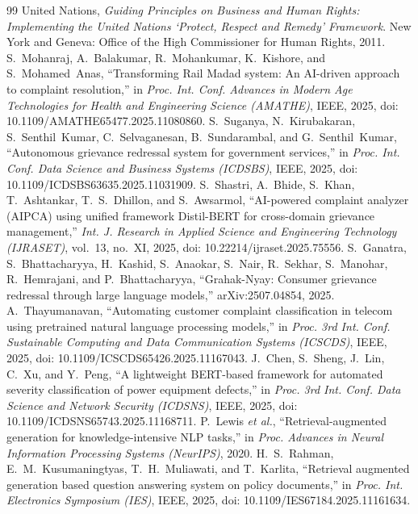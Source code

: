 \documentclass[conference]{IEEEtran}
\begin{document}
\begin{thebibliography}{99}
\footnotesize
{} United Nations, \emph{Guiding Principles on Business and Human Rights: Implementing the United Nations `Protect, Respect and Remedy' Framework}. New York and Geneva: Office of the High Commissioner for Human Rights, 2011.
 S.~Mohanraj, A.~Balakumar, R.~Mohankumar, K.~Kishore, and S.~Mohamed~Anas, ``Transforming Rail Madad system: An AI-driven approach to complaint resolution,'' in \emph{Proc. Int. Conf. Advances in Modern Age Technologies for Health and Engineering Science (AMATHE)}, IEEE, 2025, doi: 10.1109/AMATHE65477.2025.11080860.
 S.~Suganya, N.~Kirubakaran, S.~Senthil~Kumar, C.~Selvaganesan, B.~Sundarambal, and G.~Senthil~Kumar, ``Autonomous grievance redressal system for government services,'' in \emph{Proc. Int. Conf. Data Science and Business Systems (ICDSBS)}, IEEE, 2025, doi: 10.1109/ICDSBS63635.2025.11031909.
 S.~Shastri, A.~Bhide, S.~Khan, T.~Ashtankar, T.~S.~Dhillon, and S.~Awsarmol, ``AI-powered complaint analyzer (AIPCA) using unified framework Distil-BERT for cross-domain grievance management,'' \emph{Int. J. Research in Applied Science and Engineering Technology (IJRASET)}, vol.~13, no.~XI, 2025, doi: 10.22214/ijraset.2025.75556.
 S.~Ganatra, S.~Bhattacharyya, H.~Kashid, S.~Anaokar, S.~Nair, R.~Sekhar, S.~Manohar, R.~Hemrajani, and P.~Bhattacharyya, ``Grahak-Nyay: Consumer grievance redressal through large language models,'' arXiv:2507.04854, 2025.
 A.~Thayumanavan, ``Automating customer complaint classification in telecom using pretrained natural language processing models,'' in \emph{Proc. 3rd Int. Conf. Sustainable Computing and Data Communication Systems (ICSCDS)}, IEEE, 2025, doi: 10.1109/ICSCDS65426.2025.11167043.
 J.~Chen, S.~Sheng, J.~Lin, C.~Xu, and Y.~Peng, ``A lightweight BERT-based framework for automated severity classification of power equipment defects,'' in \emph{Proc. 3rd Int. Conf. Data Science and Network Security (ICDSNS)}, IEEE, 2025, doi: 10.1109/ICDSNS65743.2025.11168711.
 P.~Lewis \emph{et al.}, ``Retrieval-augmented generation for knowledge-intensive NLP tasks,'' in \emph{Proc. Advances in Neural Information Processing Systems (NeurIPS)}, 2020.
 H.~S.~Rahman, E.~M.~Kusumaningtyas, T.~H.~Muliawati, and T.~Karlita, ``Retrieval augmented generation based question answering system on policy documents,'' in \emph{Proc. Int. Electronics Symposium (IES)}, IEEE, 2025, doi: 10.1109/IES67184.2025.11161634.

\end{thebibliography}
\end{document}
